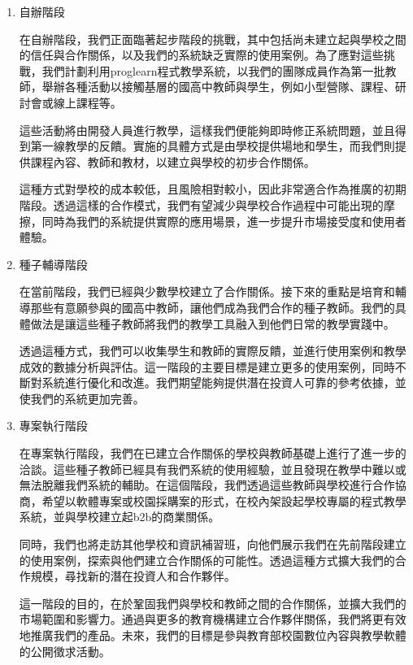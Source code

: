 \begin{enumerate}
  \setlength{\parindent}{2em}
  \item 自辦階段
  \par 在自辦階段，我們正面臨著起步階段的挑戰，其中包括尚未建立起與學校之間的信任與合作關係，以及我們的系統缺乏實際的使用案例。為了應對這些挑戰，我們計劃利用proglearn程式教學系統，以我們的團隊成員作為第一批教師，舉辦各種活動以接觸基層的國高中教師與學生，例如小型營隊、課程、研討會或線上課程等。
  \par 這些活動將由開發人員進行教學，這樣我們便能夠即時修正系統問題，並且得到第一線教學的反饋。實施的具體方式是由學校提供場地和學生，而我們則提供課程內容、教師和教材，以建立與學校的初步合作關係。
  \par 這種方式對學校的成本較低，且風險相對較小，因此非常適合作為推廣的初期階段。透過這樣的合作模式，我們有望減少與學校合作過程中可能出現的摩擦，同時為我們的系統提供實際的應用場景，進一步提升市場接受度和使用者體驗。
  \item 種子輔導階段
  \par 在當前階段，我們已經與少數學校建立了合作關係。接下來的重點是培育和輔導那些有意願參與的國高中教師，讓他們成為我們合作的種子教師。我們的具體做法是讓這些種子教師將我們的教學工具融入到他們日常的教學實踐中。
  \par 透過這種方式，我們可以收集學生和教師的實際反饋，並進行使用案例和教學成效的數據分析與評估。這一階段的主要目標是建立更多的使用案例，同時不斷對系統進行優化和改進。我們期望能夠提供潛在投資人可靠的參考依據，並使我們的系統更加完善。
  \item 專案執行階段
  \par 在專案執行階段，我們在已建立合作關係的學校與教師基礎上進行了進一步的洽談。這些種子教師已經具有我們系統的使用經驗，並且發現在教學中難以或無法脫離我們系統的輔助。在這個階段，我們透過這些教師與學校進行合作協商，希望以軟體專案或校園採購案的形式，在校內架設起學校專屬的程式教學系統，並與學校建立起b2b的商業關係。
  \par 同時，我們也將走訪其他學校和資訊補習班，向他們展示我們在先前階段建立的使用案例，探索與他們建立合作關係的可能性。透過這種方式擴大我們的合作規模，尋找新的潛在投資人和合作夥伴。
  \par 這一階段的目的，在於鞏固我們與學校和教師之間的合作關係，並擴大我們的市場範圍和影響力。通過與更多的教育機構建立合作夥伴關係，我們將更有效地推廣我們的產品。未來，我們的目標是參與教育部校園數位內容與教學軟體的公開徵求活動。
\end{enumerate}